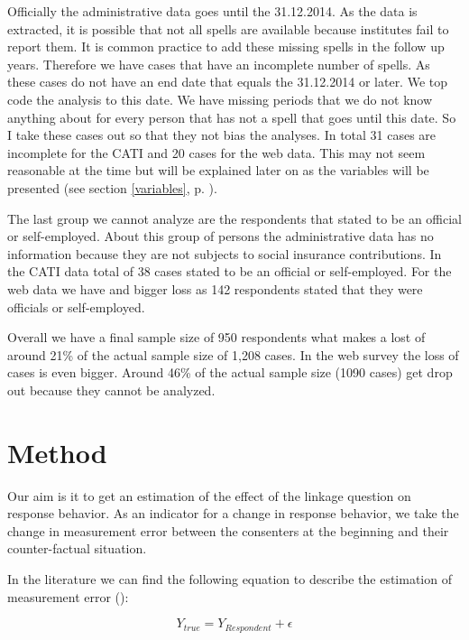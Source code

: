 	Officially the administrative data goes until the 31.12.2014. As the data is extracted, it is possible that not all spells are available because institutes fail to report them. It is common practice to add these missing spells in the follow up years. Therefore we have cases that have an incomplete number of spells. As these cases do not have an end date that equals the 31.12.2014 or later. We top code the analysis to this date. We have missing periods that we do not know anything about for every person that has not a spell that goes until this date. So I take these cases out so that they not bias the analyses. In total 31 cases are incomplete for the CATI and 20 cases for the web data. This may not seem reasonable at the time but will be explained later on as the variables will be presented (see section \ref{variables}, p. \pageref{variables}).
	
	The last group we cannot analyze are the respondents that stated to be an official or self-employed. About this group of persons the administrative data has no information because they are not subjects to social insurance contributions. In the CATI data total of 38 cases stated to be an official or self-employed. For the web data we have and bigger loss as 142 respondents stated that they were officials or self-employed.
	
	Overall we have a final sample size of 950 respondents what makes a lost of around 21\% of the actual sample size of 1,208 cases. In the web survey the loss of cases is even bigger. Around 46\% of the actual sample size (1090 cases) get drop out because they cannot be analyzed.
	


\section{Method}\label{method}

Our aim is it to get an estimation of the effect of the linkage question on response behavior. As an indicator for a change in response behavior, we take the change in measurement error between the consenters at the beginning and their counter-factual situation. 

In the literature we can find the following equation to describe the estimation of measurement error (\cite{Grovesetal 09}):

\begin{equation}
Y_{true} = Y_{Respondent} + \epsilon
\end{equation}

